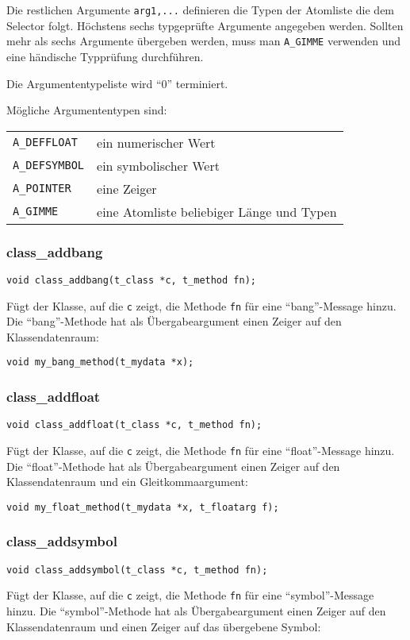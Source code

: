 \documentclass[12pt, a4paper,austrian, titlepage]{article}
\begin{document}
\begin{appendix}
Die restlichen Argumente \verb+arg1,...+ definieren
die Typen der Atomliste die dem Selector folgt.
Höchstens sechs typgeprüfte Argumente angegeben werden.
Sollten mehr als sechs Argumente übergeben werden, muss man
\verb+A_GIMME+ verwenden und eine händische Typprüfung durchführen.

Die Argumententypeliste wird ``0'' terminiert.

Mögliche Argumententypen sind:

\begin{tabular}{l|l}
\verb+A_DEFFLOAT+ & ein numerischer Wert \\
\verb+A_DEFSYMBOL+ & ein symbolischer Wert \\
\verb+A_POINTER+ & eine Zeiger \\
\verb+A_GIMME+ & eine Atomliste beliebiger Länge und Typen \\
\end{tabular}

\subsubsection{class\_addbang}
\begin{verbatim}
void class_addbang(t_class *c, t_method fn);
\end{verbatim}
Fügt der Klasse, auf die \verb+c+ zeigt, die Methode \verb+fn+ 
für eine ``bang''-Message hinzu.
Die ``bang''-Methode hat als Übergabeargument einen Zeiger auf den Klassendatenraum:

\verb+void my_bang_method(t_mydata *x);+

\subsubsection{class\_addfloat}
\begin{verbatim}
void class_addfloat(t_class *c, t_method fn);
\end{verbatim}
Fügt der Klasse, auf die \verb+c+ zeigt, die Methode \verb+fn+ 
für eine ``float''-Message hinzu.
Die ``float''-Methode hat als Übergabeargument einen Zeiger auf den Klassendatenraum und
ein Gleitkommaargument:

\verb+void my_float_method(t_mydata *x, t_floatarg f);+

\subsubsection{class\_addsymbol}
\begin{verbatim}
void class_addsymbol(t_class *c, t_method fn);
\end{verbatim}
Fügt der Klasse, auf die \verb+c+ zeigt, die Methode \verb+fn+ 
für eine ``symbol''-Message hinzu.
Die ``symbol''-Methode hat als Übergabeargument einen Zeiger auf den Klassendatenraum und
einen Zeiger auf das übergebene Symbol:


\end{appendix}
\end{document}
